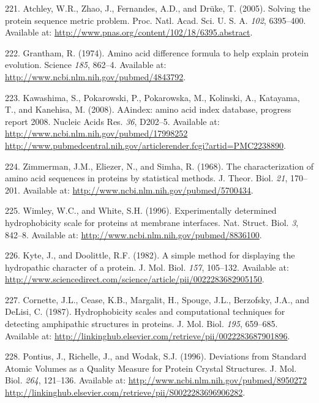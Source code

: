 \documentclass[11pt,a4paper,twoside]{book}
\theoremstyle{definition}
\theoremstyle{definition}
\theoremstyle{remark}
\begin{document}
\hypertarget{ref-Atchley2005}{}
221. Atchley, W.R., Zhao, J., Fernandes, A.D., and Drüke, T. (2005).
Solving the protein sequence metric problem. Proc. Natl. Acad. Sci. U.
S. A. \emph{102}, 6395--400. Available at:
\url{http://www.pnas.org/content/102/18/6395.abstract}.

\hypertarget{ref-Grantham1974}{}
222. Grantham, R. (1974). Amino acid difference formula to help explain
protein evolution. Science \emph{185}, 862--4. Available at:
\url{http://www.ncbi.nlm.nih.gov/pubmed/4843792}.

\hypertarget{ref-Kawashima2008}{}
223. Kawashima, S., Pokarowski, P., Pokarowska, M., Kolinski, A.,
Katayama, T., and Kanehisa, M. (2008). AAindex: amino acid index
database, progress report 2008. Nucleic Acids Res. \emph{36}, D202--5.
Available at:
\href{http://www.ncbi.nlm.nih.gov/pubmed/17998252\%20http://www.pubmedcentral.nih.gov/articlerender.fcgi?artid=PMC2238890}{http://www.ncbi.nlm.nih.gov/pubmed/17998252 http://www.pubmedcentral.nih.gov/articlerender.fcgi?artid=PMC2238890}.

\hypertarget{ref-Zimmerman1968}{}
224. Zimmerman, J.M., Eliezer, N., and Simha, R. (1968). The
characterization of amino acid sequences in proteins by statistical
methods. J. Theor. Biol. \emph{21}, 170--201. Available at:
\url{http://www.ncbi.nlm.nih.gov/pubmed/5700434}.

\hypertarget{ref-Wimley1996}{}
225. Wimley, W.C., and White, S.H. (1996). Experimentally determined
hydrophobicity scale for proteins at membrane interfaces. Nat. Struct.
Biol. \emph{3}, 842--8. Available at:
\url{http://www.ncbi.nlm.nih.gov/pubmed/8836100}.

\hypertarget{ref-Kyte1982}{}
226. Kyte, J., and Doolittle, R.F. (1982). A simple method for
displaying the hydropathic character of a protein. J. Mol. Biol.
\emph{157}, 105--132. Available at:
\url{http://www.sciencedirect.com/science/article/pii/0022283682905150}.

\hypertarget{ref-Cornette1987}{}
227. Cornette, J.L., Cease, K.B., Margalit, H., Spouge, J.L., Berzofsky,
J.A., and DeLisi, C. (1987). Hydrophobicity scales and computational
techniques for detecting amphipathic structures in proteins. J. Mol.
Biol. \emph{195}, 659--685. Available at:
\url{http://linkinghub.elsevier.com/retrieve/pii/0022283687901896}.

\hypertarget{ref-Pontius1996}{}
228. Pontius, J., Richelle, J., and Wodak, S.J. (1996). Deviations from
Standard Atomic Volumes as a Quality Measure for Protein Crystal
Structures. J. Mol. Biol. \emph{264}, 121--136. Available at:
\href{http://www.ncbi.nlm.nih.gov/pubmed/8950272\%20http://linkinghub.elsevier.com/retrieve/pii/S0022283696906282}{http://www.ncbi.nlm.nih.gov/pubmed/8950272 http://linkinghub.elsevier.com/retrieve/pii/S0022283696906282}.
\end{document}
